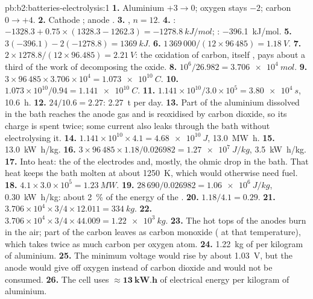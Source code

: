 \begin{solution}{pb:b2:batteries-electrolysis:1}
\textbf{1.} Aluminium $+3 \to 0$; oxygen stays $-2$; carbon $0 \to +4$.
\textbf{2.} Cathode ; anode .
\textbf{3.} , $n = 12$.
\textbf{4.} : $-1328.3 + 0.75 \times (1328.3 - 1262.3) = \qty{-1278.8}{kJ/mol}$;
: \qty{-396.1}{kJ/mol}.
\textbf{5.} $3(-396.1) - 2(-1278.8) = \qty{+1369}{kJ}$.
\textbf{6.} $1\,369\,000/(12 \times 96\,485) = \qty{1.18}{V}$.
\textbf{7.} $2 \times 1278.8/(12 \times 96.485) = \qty{2.21}{V}$: the oxidation of carbon,
itself , pays about a third of the work of decomposing the oxide.
\textbf{8.} $10^6/26.982 = \qty{3.706e4}{mol}$.
\textbf{9.} $3 \times 96\,485 \times 3.706 \times 10^4 = \qty{1.073e10}{C}$.
\textbf{10.} $1.073 \times 10^{10}/0.94 = \qty{1.141e10}{C}$.
\textbf{11.} $1.141 \times 10^{10}/3.0 \times 10^5 = \qty{3.80e4}{s}$, \qty{10.6}{h}.
\textbf{12.} $24/10.6 = 2.27$: \qty{2.27}{t} per day.
\textbf{13.} Part of the aluminium dissolved in the bath reaches the anode gas and
is reoxidised by carbon dioxide, so its charge is spent twice; some current
also leaks through the bath without electrolysing it.
\textbf{14.} $1.141 \times 10^{10} \times 4.1 = \qty{4.68e10}{J}$, \qty{13.0}{MW.h}.
\textbf{15.} \qty{13.0}{kW.h/kg}.
\textbf{16.} $3 \times 96\,485 \times 1.18/0.026982 = \qty{1.27e7}{J/kg}$, \qty{3.5}{kW.h/kg}.
\textbf{17.} Into heat: the  of the electrodes and, mostly, the
ohmic drop in the bath. That heat keeps the bath molten at about
\qty{1250}{K}, which would otherwise need fuel.
\textbf{18.} $4.1 \times 3.0 \times 10^5 = \qty{1.23}{MW}$.
\textbf{19.} $28\,690/0.026982 = \qty{1.06e6}{J/kg}$, \qty{0.30}{kW.h/kg}: about 2~\% of
the energy of the .
\textbf{20.} $1.18/4.1 = 0.29$.
\textbf{21.} $3.706 \times 10^4 \times 3/4 \times 12.011 = \qty{334}{kg}$.
\textbf{22.} $3.706 \times 10^4 \times 3/4 \times 44.009 = \qty{1.22e3}{kg}$.
\textbf{23.} The hot tops of the anodes burn in the air; part of the carbon leaves
as carbon monoxide ( at that temperature), which takes twice as
much carbon per oxygen atom.
\textbf{24.} \qty{1.22}{kg} of  per kilogram of aluminium.
\textbf{25.} The minimum voltage would rise by about \qty{1.03}{V}, but the anode
would give off oxygen instead of carbon dioxide and would not be consumed.
\textbf{26.} The cell uses $\boldsymbol{\approx \qty{13}{kW.h}}$ of electrical
energy per kilogram of aluminium.
\end{solution}

